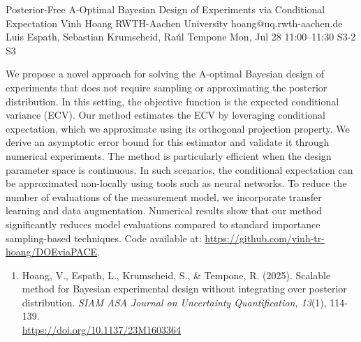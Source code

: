 \begin{talk}
  {Posterior-Free A-Optimal Bayesian Design of Experiments via Conditional Expectation}%
  {Vinh Hoang}%
  {RWTH-Aachen University}%
  {hoang@uq.rwth-aachen.de}%
  {Luis Espath, Sebastian Krumscheid, Ra\'ul Tempone}%
  {}%
  {Mon, Jul 28 11:00--11:30}%
  {S3-2}%
  {S3}%
  
    
   

\medskip

We propose a novel approach for solving the A-optimal Bayesian design of experiments that does not require sampling or approximating the posterior distribution. In this setting, the objective function is the expected conditional variance (ECV).
Our method estimates the ECV by leveraging conditional expectation, which we approximate using its orthogonal projection property. We derive an asymptotic error bound for this estimator and validate it through numerical experiments.
The method is particularly efficient when the design parameter space is continuous. In such scenarios, the conditional expectation can be approximated non-locally using tools such as neural networks. To reduce the number of evaluations of the measurement model, we incorporate transfer learning and data augmentation.
Numerical results show that our method significantly reduces model evaluations compared to standard importance sampling-based techniques.
Code available at: \href{https://github.com/vinh-tr-hoang/DOEviaPACE}{https://github.com/vinh-tr-hoang/DOEviaPACE}.

\begin{enumerate}
    \item [{[1]}] Hoang, V., Espath, L., Krumscheid, S., \& Tempone, R. (2025).  
    Scalable method for Bayesian experimental design without integrating over posterior distribution. {\it SIAM ASA Journal on Uncertainty Quantification, 13}(1), 114-139. \\
    \href{https://doi.org/10.1137/23M1603364}{https://doi.org/10.1137/23M1603364}
\end{enumerate}


\end{talk}

